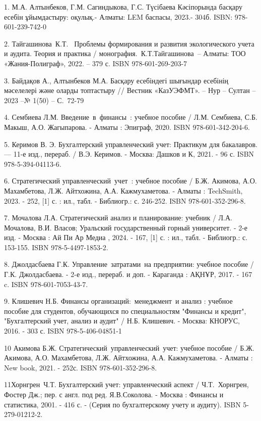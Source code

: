 	\begin{references}

1. М.А. Алтынбеков, Г.М. Сагиндыкова, Г.С. Түсібаева Кәсіпорында басқару
есебін ұйымдастыру: оқулық.- Алматы: LEM баспасы, 2023.- 304б. ISBN:
978-601-239-742-0

2. Тайгашинова~К.Т.~ Проблемы формирования и развития экологического
учета и аудита. Теория и практика / монография.~К.Т.Тайгашинова~--
Алматы: ТОО «Жания-Полиграф», 2022. -- 379 с. ISBN 978-601-269-203-7

3. Байдақов А., Алтынбеков М.А. Басқару есебіндегі шығындар есебінің
мәселелері және оларды топтастыру // Вестник «КазУЭФМТ». -- Нур --
Султан -- 2023 --№ 1(50) -- С.~72-79

4. Сембиева Л.М. Введение~в~финансы~: учебное пособие / Л.М. Сембиева,
С.Б. Макыш, А.О. Жагыпарова. - Алматы : Эпиграф, 2020. ISBN
978-601-342-204-6.

5. Керимов В. Э. Бухгалтерский управленческий учет: Практикум для
бакалавров. --- 11-е изд., перераб. / В.Э. Керимов. - Москва: Дашков и
К, 2021. - 96 с. ISBN 978-5-394-04113-6.~

6. Стратегический управленческий~учет~: учебное пособие / Б.Ж. Акимова,
А.О. Махамбетова, Л.Ж. Айтхожина, А.А. Кажмухаметова. - Алматы :
TechSmith, 2023. - 252, {[}1{]} с. : ил., табл. - Библиогр.: с. 246-252.
ISBN 978-601-352-296-8.~

7. Мочалова Л.А. Стратегический анализ и планирование: учебник / Л.А.
Мочалова, В.И. Власов; Уральский государственный горный университет. -
2-е изд. - Москва : Ай Пи Ар Медиа , 2024. - 167, {[}1{]} с. : ил.,
табл. - Библиогр.: с. 153-155. ISBN 978-5-4497-1853-2.

8. Джолдасбаева Г.К. Управление~затратами~на предприятии: учебное
пособие / Г.К. Джолдасбаева. - 2-е изд., перераб. и доп. - Караганда :
АҚНҰР, 2017. - 167 c. ISBN 978-601-7053-43-7.

9. Клишевич Н.Б. Финансы организаций:~менеджмент~и анализ : учебное
пособие для студентов, обучающихся по специальностям "Финансы и кредит",
"Бухгалтерский учет, анализ и аудит" / Н.Б. Клишевич. - Москва: КНОРУС,
2016. - 303 с. ISBN 978-5-406-04851-1

10 Акимова Б.Ж. Стратегический~управленческий~учет: учебное пособие /
Б.Ж. Акимова, А.О. Махамбетова, Л.Ж. Айтхожина, А.А. Кажмухаметова. -
Алматы : New book, 2021. - 252с. ISBN 978-601-352-296-8.

11Хорнгрен~Ч.Т. Бухгалтерский учет: управленческий аспект /
Ч.Т.~Хорнгрен, Фостер Дж.; пер. с англ. под ред. Я.В.Соколова. - Москва
: Финансы и статистика, 2001. - 416 с. - (Серия по бухгалтерскому учету
и аудиту). ISBN 5-279-01212-2.


\end{references}
